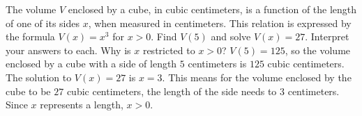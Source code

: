 {The volume $V$ enclosed by a cube, in cubic centimeters, is a function of the length of one of its sides $x$, when measured in centimeters.  This relation is expressed by the formula $V(x) = x^3$ for $x > 0$.  Find $V(5)$ and solve $V(x) = 27$.  Interpret your answers to each.  Why is $x$ restricted to $x > 0$?}
{$V(5) = 125$, so the volume enclosed by a cube with a side of length $5$ centimeters is $125$ cubic centimeters.  The solution to $V(x) = 27$ is $x = 3$.  This means for the volume enclosed by the cube to be $27$ cubic centimeters, the length of the side needs to $3$ centimeters.  Since $x$ represents a length, $x > 0$.}